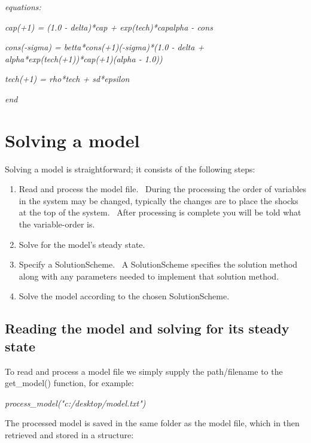 \documentclass[notitlepage,11pt]{article}
\begin{document}
\textit{\bigskip }

\textit{equations:}

\textit{cap(+1) = (1.0 - delta)*cap + exp(tech)*capalpha - cons}

\textit{cons(-sigma) = betta*cons(+1)(-sigma)*(1.0 -
delta + alpha*exp(tech(+1))*cap(+1)(alpha - 1.0))}

\textit{tech(+1) = rho*tech + sd*epsilon}

\textit{end}

\section{Solving a model}

Solving a model is straightforward; it consists of the following steps:

\begin{enumerate}
\item Read and process the model file. \ During the processing the order of
variables in the system may be changed, typically the changes are to place
the shocks at the top of the system. \ After processing is complete you will
be told what the variable-order is.

\item Solve for the model's steady state.

\item Specify a SolutionScheme. \ A SolutionScheme specifies the solution
method along with any parameters needed to implement that solution method.

\item Solve the model according to the chosen SolutionScheme.
\end{enumerate}

\subsection{Reading the model and solving for its steady state}

To read and process a model file we simply supply the path/filename to the
get\_model() function, for example:

\bigskip

\textit{process\_model("c:/desktop/model.txt")}

\bigskip

The processed model is saved in the same folder as the model file, which in
then retrieved and stored in a structure:
\end{document}

